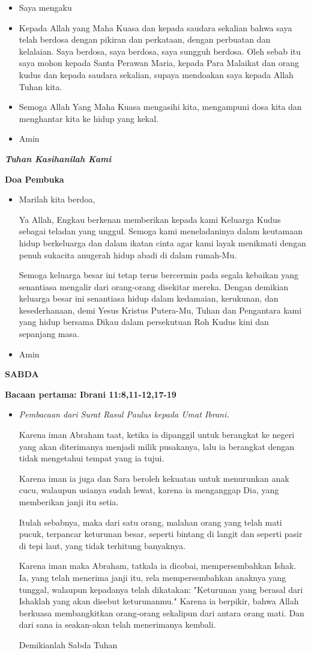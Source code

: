 \documentclass[a5paper,12pt,openany]{scrbook}
\makeatletter
\newcommand{\judul}[1]{%
  {\parindent \z@ \centering \normalfont
    \interlinepenalty\@M \Large \bfseries #1\par\nobreak \vskip 20\p@ }}
\newcommand{\subjudul}[1]{%
  {\parindent \z@ \normalfont
    \interlinepenalty\@M \bfseries #1\par\nobreak \vskip 20\p@ }}
\newcommand{\lagu}[1]{%
  {\parindent \z@ \normalfont
    \interlinepenalty\@M \bfseries \emph{#1}\par\nobreak \vskip 20\p@ }}
\newcommand{\BU}[1]{\begin{itemize} \item[U:] #1 \end{itemize}}
\newcommand{\BI}[1]{\begin{itemize} \item[P:] #1 \end{itemize}}
\newcommand{\BP}[1]{\begin{itemize} \item[P:] #1 \end{itemize}}
\makeatother
\begin{document}
\BI{Saya mengaku}

\BU{Kepada Allah yang Maha Kuasa dan kepada saudara sekalian bahwa saya telah berdosa dengan pikiran dan perkataan, dengan perbuatan dan kelalaian. Saya berdosa, saya berdosa, saya sungguh berdosa. Oleh sebab itu saya mohon kepada Santa Perawan Maria, kepada Para Malaikat dan orang kudus dan kepada saudara sekalian, supaya mendoakan saya kepada Allah Tuhan kita.}

\BI{Semoga Allah Yang Maha Kuasa mengasihi kita, mengampuni dosa kita dan menghantar kita ke hidup yang kekal.}

\BU{Amin}

\lagu{Tuhan Kasihanilah Kami}

\subjudul{Doa Pembuka}

\BI{Marilah kita berdoa,

Ya Allah, Engkau berkenan memberikan kepada kami Keluarga Kudus sebagai teladan yang unggul. Semoga kami meneladaninya dalam keutamaan hidup berkeluarga dan dalam ikatan cinta agar kami layak menikmati dengan penuh sukacita anugerah hidup abadi di dalam rumah-Mu.

Semoga keluarga besar ini tetap terus bercermin pada segala kebaikan yang senantiasa mengalir dari orang-orang disekitar mereka. Dengan demikian keluarga besar ini senantiasa hidup dalam kedamaian, kerukunan, dan kesederhanaan, demi Yesus Kristus Putera-Mu, Tuhan dan Pengantara kami yang hidup bersama Dikau dalam persekutuan Roh Kudus kini dan sepanjang masa.}

\BU{Amin}

\judul{SABDA}

\subjudul{Bacaan pertama: Ibrani 11:8,11-12,17-19}

\BP{\emph{Pembacaan dari Surat Rasul Paulus kepada Umat Ibrani.}

Karena iman Abraham taat, ketika ia dipanggil untuk berangkat ke negeri yang akan diterimanya menjadi milik pusakanya, lalu ia berangkat dengan tidak mengetahui tempat yang ia tujui.

Karena iman ia juga dan Sara beroleh kekuatan untuk menurunkan anak cucu, walaupun usianya sudah lewat, karena ia menganggap Dia, yang memberikan janji itu setia.

Itulah sebabnya, maka dari satu orang, malahan orang yang telah mati pucuk, terpancar keturunan besar, seperti bintang di langit dan seperti pasir di tepi laut, yang tidak terhitung banyaknya.

Karena iman maka Abraham, tatkala ia dicobai, mempersembahkan Ishak. Ia, yang telah menerima janji itu, rela mempersembahkan anaknya yang tunggal, walaupun kepadanya telah dikatakan: "Keturunan yang berasal dari Ishaklah yang akan disebut keturunanmu."
Karena ia berpikir, bahwa Allah berkuasa membangkitkan orang-orang sekalipun dari antara orang mati. Dan dari sana ia seakan-akan telah menerimanya kembali.

Demikianlah Sabda Tuhan
}
\end{document}
